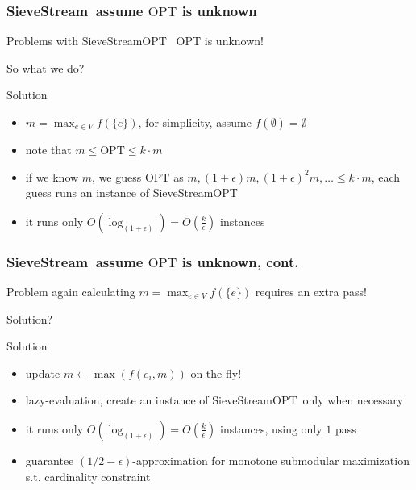 \documentclass{beamer}
\newcommand{\opt}{\text{OPT}}
\newcommand{\eps}{\epsilon}
\newcommand{\sieveStream}{{\sc SieveStream}~}
\newcommand{\sieveStreamOPT}{{\sc SieveStreamOPT}~}
\begin{document}
\begin{frame}
  \frametitle{\sieveStream assume $\opt$ is unknown}
  \begin{block}{Problems with \sieveStreamOPT}
    \large{$\opt$ is unknown!}
  \end{block}
  So what we do?    
  \begin{block}{Solution}
    \begin{itemize}
    \item $m = \max_{e\in V}f(\{e\})$, for simplicity, assume $f(\emptyset) = \emptyset$
    \item note that $m \leq \opt \leq k\cdot m$
    \item if we know $m$, we guess $\opt$ as $m, (1 + \eps) m, (1 + \eps)^2m, \ldots \leq  k\cdot m$, each guess runs an instance of \sieveStreamOPT
    \item it runs only $O(\log_{(1 + \eps)}) = O(\frac{k}{\eps})$ instances
    \end{itemize}
  \end{block}
\end{frame}

\begin{frame}
 \frametitle{\sieveStream assume $\opt$ is unknown, cont.}
 \begin{block}{Problem again}
    \large{calculating $m = \max_{e\in V}f(\{e\})$ requires an extra pass!}
  \end{block}
  Solution?
  \begin{block}{Solution}
    \begin{itemize}
    \item update $m \gets \max(f({e_i}, m))$ on the fly!
    \item lazy-evaluation, create an instance of \sieveStreamOPT only when necessary
    \item it runs only $O(\log_{(1 + \eps)}) = O(\frac{k}{\eps})$ instances, using only $1$ pass
    \item guarantee $(1/2 - \eps)$-approximation for monotone submodular maximization s.t. cardinality constraint
    \end{itemize}
  \end{block}
\end{frame}
\end{document}
